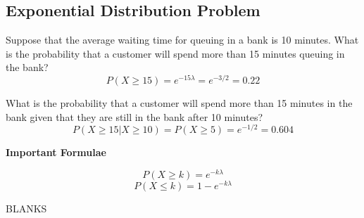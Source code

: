 \documentclass[a4paper,12pt]{article}
\begin{document}
\large 

\subsection*{Exponential Distribution Problem}
\noindent Suppose that the average waiting time for queuing in a bank is 10 minutes.
What is the probability that a customer will spend more than 15 minutes queuing in the bank?
\[
P (X \geq 15) = e ^{-15\lambda}
= e ^{-3 / 2}
= 0.22
\]
\bigskip

\noindent What is the probability that a customer will spend more than 15 minutes in the bank given that they are still in the bank after 10 minutes?
\[
P (X \geq 15|X \geq 10) = P (X \geq 5) 
= e ^{-1 / 2}
= 0.604
\]

\begin{framed}
\large 
\noindent \textbf{Important Formulae}

\[
P( X \geq k) =e^{-k \lambda }\]
\medskip 
\[
P( X \leq k) = 1 -e^{-k\lambda }\]
\end{framed}
\newpage
BLANKS
\end{document}
